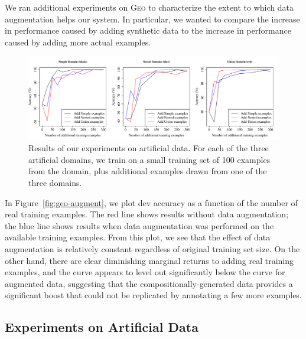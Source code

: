 \documentclass[11pt,letterpaper]{article}
\newcommand{\geo}{\textsc{Geo}\xspace}
\begin{document}
We ran additional experiments on \geo to characterize
the extent to which data augmentation helps our system.
In particular, we wanted to compare the increase in performance
caused by adding synthetic data to the 
increase in performance caused by adding more actual examples.

\begin{figure}[t] 
\small
\begin{center} 
  \includegraphics[scale=0.55]{fig-artificial.pdf}
\end{center} 
\caption{Results of our experiments on artificial data.
For each of the three artificial domains,
we train on a small training set of 100 examples from the domain,
plus additional examples drawn from one of the three domains.}
\label{fig:artificial}
\end{figure}

In Figure~\ref{fig:geo-augment}, we plot dev accuracy as a function of
the number of real training examples.  The red line
shows results without data augmentation;
the blue line shows results when data augmentation was 
performed on the available training examples.
From this plot, we see that the effect of 
data augmentation is relatively constant regardless
of original training set size.
On the other hand, there are clear diminishing marginal returns
to adding real training examples, and the curve appears to level out
significantly below the curve for augmented data,
suggesting that the compositionally-generated data
provides a significant boost that could not be replicated
by annotating a few more examples.

\subsection{Experiments on Artificial Data}


\end{document}
